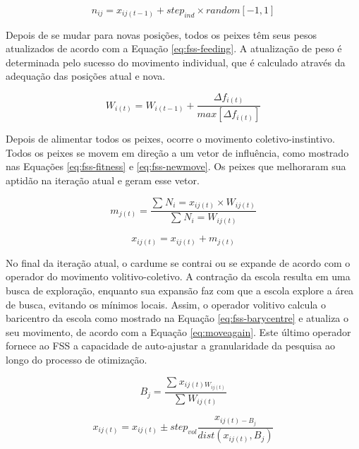 \begin{equation} \label{eq:fss-movement}
    n_{ij} = x_{ij(t-1)} + step_{ind} \times random[-1,1]
\end{equation}

Depois de se mudar para novas posições, todos os peixes têm seus pesos atualizados de acordo com a Equação \ref{eq:fss-feeding}. A atualização de peso é determinada pelo sucesso do movimento individual, que é calculado através da adequação das posições atual e nova.

\begin{equation} \label{eq:fss-feeding}
    W_{i(t)} = W_{i(t-1)} + \frac{\Delta f_{i(t)}}{max[\Delta f_{i(t)}]}
\end{equation}

Depois de alimentar todos os peixes, ocorre o movimento coletivo-instintivo. Todos os peixes se movem em direção a um vetor de influência, como mostrado nas Equações \ref{eq:fss-fitness} e \ref{eq:fss-newmove}. Os peixes que melhoraram sua aptidão na iteração atual e geram esse vetor.

\begin{equation} \label{eq:fss-fitness}
    m_{j(t)} = \frac{\sum_{}^{} N_i = x_{ij(t)} \times W_{ij(t)}}{\sum_{}^{} N_i = W_{ij(t)}}
\end{equation}

\begin{equation} \label{eq:fss-newmove}
    x_{ij(t)} = x_{ij(t)} + m_{j(t)}
\end{equation}

No final da iteração atual, o cardume se contrai ou se expande de acordo com o operador do movimento volitivo-coletivo. A contração da escola resulta em uma busca de exploração, enquanto sua expansão faz com que a escola explore a área de busca, evitando os mínimos locais. Assim, o operador volitivo calcula o baricentro da escola como mostrado na Equação \ref{eq:fss-barycentre} e atualiza o seu movimento, de acordo com a Equação \ref{eq:moveagain}. Este último operador fornece ao FSS a capacidade de auto-ajustar a granularidade da pesquisa ao longo do processo de otimização.

\begin{equation} \label{eq:fss-barycentre}
    B_j = \frac{\sum_{}^{} x_{ij(t)W_{ij(t)}}}{\sum_{}^{} W_{ij(t)}}
\end{equation}

\begin{equation} \label{eq:moveagain}
    x_{ij(t)} = x_{ij(t)} \pm step_{vol}\frac{x_{ij(t) - B_j}}{dist(x_{ij(t)}, B_j)}
\end{equation}


